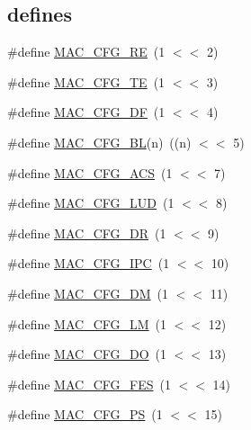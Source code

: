 \subsection*{\textquotesingle{}defines\textquotesingle{}}
\begin{DoxyCompactItemize}
\item 
\#define \hyperlink{group___e_n_e_t__18_x_x__43_x_x_ga2721f8d972eb40257f01e4fc759cb77b}{M\+A\+C\+\_\+\+C\+F\+G\+\_\+\+RE}~(1 $<$$<$ 2)
\item 
\#define \hyperlink{group___e_n_e_t__18_x_x__43_x_x_gadc2c8777c829511a3ca33ad2fe43422e}{M\+A\+C\+\_\+\+C\+F\+G\+\_\+\+TE}~(1 $<$$<$ 3)
\item 
\#define \hyperlink{group___e_n_e_t__18_x_x__43_x_x_ga76e80594820118f47b7084cbcf46e82d}{M\+A\+C\+\_\+\+C\+F\+G\+\_\+\+DF}~(1 $<$$<$ 4)
\item 
\#define \hyperlink{group___e_n_e_t__18_x_x__43_x_x_ga2a697be40e04ceabe0117c0e4e3451bc}{M\+A\+C\+\_\+\+C\+F\+G\+\_\+\+BL}(n)~((n) $<$$<$ 5)
\item 
\#define \hyperlink{group___e_n_e_t__18_x_x__43_x_x_ga140334e75dfd4bc924c373c59c885347}{M\+A\+C\+\_\+\+C\+F\+G\+\_\+\+A\+CS}~(1 $<$$<$ 7)
\item 
\#define \hyperlink{group___e_n_e_t__18_x_x__43_x_x_ga37c114c1f880a796a67ded01e54a0ac3}{M\+A\+C\+\_\+\+C\+F\+G\+\_\+\+L\+UD}~(1 $<$$<$ 8)
\item 
\#define \hyperlink{group___e_n_e_t__18_x_x__43_x_x_gaacc3f1e13f32b5cd272388cc3881d47c}{M\+A\+C\+\_\+\+C\+F\+G\+\_\+\+DR}~(1 $<$$<$ 9)
\item 
\#define \hyperlink{group___e_n_e_t__18_x_x__43_x_x_ga7976527b6a27cf4914acd260a2da2fed}{M\+A\+C\+\_\+\+C\+F\+G\+\_\+\+I\+PC}~(1 $<$$<$ 10)
\item 
\#define \hyperlink{group___e_n_e_t__18_x_x__43_x_x_ga88f18b0bf9c694534e3616971de33f74}{M\+A\+C\+\_\+\+C\+F\+G\+\_\+\+DM}~(1 $<$$<$ 11)
\item 
\#define \hyperlink{group___e_n_e_t__18_x_x__43_x_x_gabfd535c7e4f58dcde4ce3f7d1de3c1a7}{M\+A\+C\+\_\+\+C\+F\+G\+\_\+\+LM}~(1 $<$$<$ 12)
\item 
\#define \hyperlink{group___e_n_e_t__18_x_x__43_x_x_gaee61760c1d9f16418075db2cc35183ce}{M\+A\+C\+\_\+\+C\+F\+G\+\_\+\+DO}~(1 $<$$<$ 13)
\item 
\#define \hyperlink{group___e_n_e_t__18_x_x__43_x_x_ga7557ac2cad88370770bcbf926a91548d}{M\+A\+C\+\_\+\+C\+F\+G\+\_\+\+F\+ES}~(1 $<$$<$ 14)
\item 
\#define \hyperlink{group___e_n_e_t__18_x_x__43_x_x_gae6c433017373eee4981c1768af1b0555}{M\+A\+C\+\_\+\+C\+F\+G\+\_\+\+PS}~(1 $<$$<$ 15)
$$
\end{DoxyCompactItemize}
